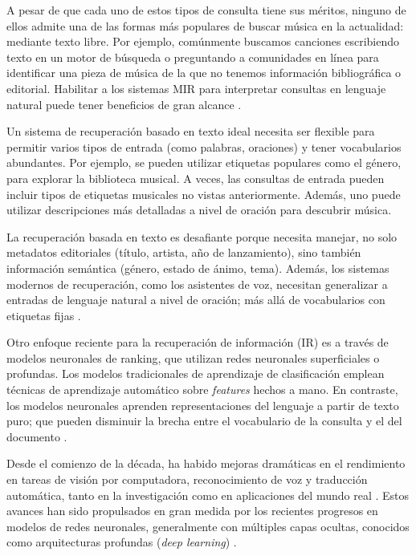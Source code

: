 A pesar de que cada uno de estos tipos de consulta tiene sus méritos, ninguno de ellos admite una de las formas más populares de buscar música en la actualidad: mediante texto libre. Por ejemplo, comúnmente buscamos canciones escribiendo texto en un motor de búsqueda o preguntando a comunidades en línea para identificar una pieza de música de la que no tenemos información bibliográfica o editorial. Habilitar a los sistemas MIR para interpretar consultas en lenguaje natural puede tener beneficios de gran alcance \cite{Manco2022ContrastiveAL}.

Un sistema de recuperación basado en texto ideal necesita ser flexible para permitir varios tipos de entrada (como palabras, oraciones) y tener vocabularios abundantes. Por ejemplo, se pueden utilizar etiquetas populares como el género, para explorar la biblioteca musical. A veces, las consultas de entrada pueden incluir tipos de etiquetas musicales no vistas anteriormente. Además, uno puede utilizar descripciones más detalladas a nivel de oración para descubrir música. %

La recuperación basada en texto es desafiante porque necesita manejar, no solo metadatos editoriales (título, artista, año de lanzamiento), sino también información semántica (género, estado de ánimo, tema). Además, los sistemas modernos de recuperación, como los asistentes de voz, necesitan generalizar a entradas de lenguaje natural a nivel de oración; más allá de vocabularios con etiquetas fijas \cite{Doh2022TowardUT}.

Otro enfoque reciente para la recuperación de información (IR) es a través de modelos neuronales de ranking, que utilizan redes neuronales superficiales o profundas. Los modelos tradicionales de aprendizaje de clasificación emplean técnicas de aprendizaje automático sobre \textit{features} hechos a mano. En contraste, los modelos neuronales aprenden representaciones del lenguaje a partir de texto puro; que pueden disminuir la brecha entre el vocabulario de la consulta y el del documento \cite{Mitra2017NeuralMF}.

Desde el comienzo de la década, ha habido mejoras dramáticas en el rendimiento en tareas de visión por computadora, reconocimiento de voz y traducción automática, tanto en la investigación como en aplicaciones del mundo real \cite{LeCun2015DeepL}. Estos avances han sido propulsados en gran medida por los recientes progresos en modelos de redes neuronales, generalmente con múltiples capas ocultas, conocidos como arquitecturas profundas (\textit{deep learning}) \cite{LeCun2015DeepL, Bahdanau2014NeuralMT, Deng2014DeepLM, Hinton2012DeepNN}. 

